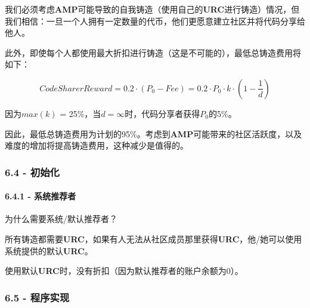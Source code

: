 \documentclass[
]{article}
\begin{document}
我们必须考虑\textbf{AMP}可能导致的自我铸造（使用自己的\textbf{URC}进行铸造）情况，但我们相信：一旦一个人拥有一定数量的代币，他们更愿意建立社区并将代码分享给他人。

此外，即使每个人都使用最大折扣进行铸造（这是不可能的），最低总铸造费用将如下：

\begin{equation}
CodeSharerReward = 0.2 \cdot (P_0 - Fee) = 0.2 \cdot P_0 \cdot k \cdot (1 - \frac{1}{d})
\end{equation}

因为\(max(k)\) = 25\%，当\(d = \infty\)时，代码分享者获得\(P_0\)的5\%。

因此，最低总铸造费用为计划的95\%。考虑到\textbf{AMP}可能带来的社区活跃度，以及难度的增加将提高铸造费用，这种减少是值得的。

\subsubsection{6.4 - 初始化}\label{ux521dux59cbux5316}

\paragraph{6.4.1 - 系统推荐者}\label{ux7cfbux7edfux63a8ux8350ux8005}

为什么需要系统/默认推荐者？

所有铸造都需要\textbf{URC}，如果有人无法从社区成员那里获得\textbf{URC}，他/她可以使用系统提供的默认\textbf{URC}。

使用默认\textbf{URC}时，没有折扣（因为默认推荐者的账户余额为0）。

\subsubsection{6.5 - 程序实现}\label{ux7a0bux5e8fux5b9eux73b0}
\end{document}
